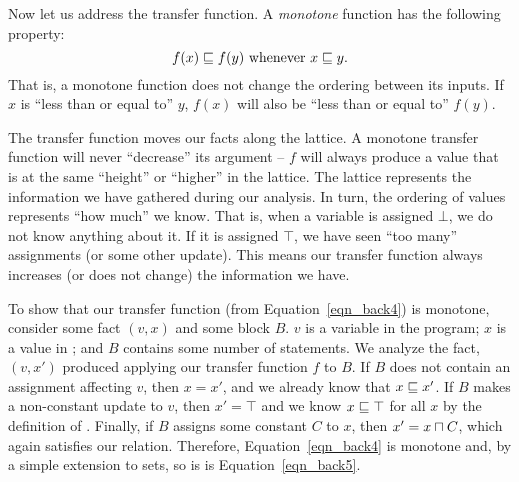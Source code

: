 \documentclass[12pt]{report}
\begin{document}
Now let us address the transfer function. A \emph{monotone} function 
has the following property:
\begin{equation}
  f(x) \sqsubseteq f(y)\ \text{whenever}\ x \sqsubseteq y.
  \label{eqn_back11}
\end{equation}
That is, a monotone function does not change the ordering between its
inputs. If $x$ is ``less than or equal to'' $y$, $f(x)$ will also be
``less than or equal to'' $f(y)$. 

The transfer function moves our facts along the lattice. A monotone
transfer function will never ``decrease'' its argument -- $f$ will
always produce a value that is at the same ``height'' or ``higher'' in
the lattice. The lattice represents the information we have gathered
during our analysis. In turn, the ordering of values represents ``how
much'' we know. That is, when a variable is assigned $\bot$, we do not
know anything about it. If it is assigned $\top$, we have seen ``too
many'' assignments (or some other update).  This means our transfer
function always increases (or does not change) the information we
have. 

To show that our transfer function (from Equation~\eqref{eqn_back4}) is
monotone, consider some fact $(v,x)$ and some block $B$. $v$ is a
variable in the program; $x$ is a value in \setLC; and $B$ contains
some number of statements.  We analyze the fact, $(v,x')$ produced
applying our transfer function $f$ to $B$. If $B$ does not contain an
assignment affecting $v$, then $x = x'$, and we already know that $x \sqsubseteq
x'$. If $B$ makes a non-constant update to $v$, then $x' = \top$ and we
know $x \sqsubseteq \top$ for all $x$ by the definition of \lub. Finally,
if $B$ assigns some constant $C$ to $x$, then $x' = x \lub C$, which
again satisfies our relation. Therefore, Equation~\eqref{eqn_back4} is
monotone and, by a simple extension to sets, so is is
Equation~\eqref{eqn_back5}.




\end{document}
